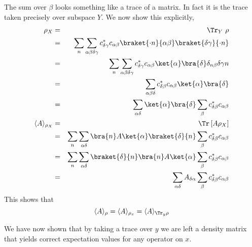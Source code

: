 \documentclass{article}
\begin{document}
The sum over $\beta$ looks something like a trace of a matrix. In fact it is the trace taken precisely over subspace $Y$. We now show this explicitly, \begin{eqnarray}
\rho_X &=& \Tr_{Y}\ \rho \nonumber \\
&=& \sum_{n} \sum_{\alpha \beta \delta \gamma} c^*_{\delta \gamma}c_{\alpha \beta} \braket{\cdot n}{\alpha \beta}\braket{\delta \gamma}{\cdot n} \nonumber \\
&=& \sum_{n} \sum_{\alpha \beta \delta \gamma} c^*_{\delta \gamma}c_{\alpha \beta} \ket{\alpha}\bra{\delta}\delta_{n\beta}\delta{\gamma n} \nonumber \\
&=& \sum_{\alpha \beta \delta} c^*_{\delta \beta}c_{\alpha \beta} \ket{\alpha}\bra{\delta} \nonumber \\
&=& \sum_{\alpha \delta} \ket{\alpha}\bra{\delta} \sum_{\beta} c^*_{\delta \beta}c_{\alpha \beta} \\
\langle A \rangle_{\rho_X} &=& \Tr \left[ A \rho_X \right] \nonumber \\
&=& \sum_n \sum_{\alpha \delta} \bra{n}A\ket{\alpha}\braket{\delta}{n} \sum_{\beta} c^*_{\delta \beta}c_{\alpha \beta} \nonumber \\
&=& \sum_n \sum_{\alpha \delta} \braket{\delta}{n}\bra{n}A\ket{\alpha} \sum_{\beta} c^*_{\delta \beta}c_{\alpha \beta} \nonumber \\
&=& \sum_{\alpha \delta} A_{\delta \alpha} \sum_{\beta} c^*_{\delta \beta}c_{\alpha \beta} \end{eqnarray}
This shows that \begin{equation}
\langle A \rangle_{\rho} = \langle A \rangle_{\rho_x} = \langle A \rangle_{\Tr_y \rho} \end{equation}

We have now shown that by taking a trace over $y$ we are left a density matrix that yields correct expectation values for any operator on $x$.
\end{document}
